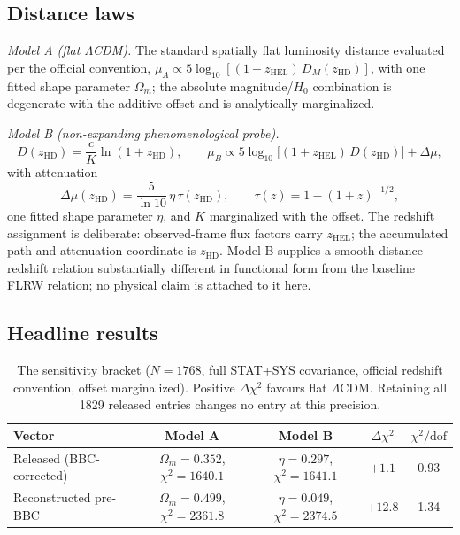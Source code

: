 \documentclass[11pt]{article}
\begin{document}
\subsection{Distance laws}
\label{sec:laws}

\emph{Model A (flat $\Lambda$CDM).} The standard spatially flat luminosity
distance evaluated per the official convention,
$\mu_A \propto 5\log_{10}[(1+z_{\mathrm{HEL}})\,D_M(z_{\mathrm{HD}})]$,
with one fitted shape parameter $\Omega_m$; the absolute magnitude/$H_0$
combination is degenerate with the additive offset and is analytically
marginalized.

\emph{Model B (non-expanding phenomenological probe).}
\begin{equation}
D(z_{\mathrm{HD}}) = \frac{c}{K}\ln(1+z_{\mathrm{HD}}), \qquad
\mu_B \propto 5\log_{10}\!\bigl[(1+z_{\mathrm{HEL}})\,
D(z_{\mathrm{HD}})\bigr] + \Delta\mu ,
\label{eq:modelB}
\end{equation}
with attenuation
\begin{equation}
\Delta\mu(z_{\mathrm{HD}})
= \frac{5}{\ln 10}\,\eta\,\tau(z_{\mathrm{HD}}), \qquad
\tau(z) = 1 - (1+z)^{-1/2},
\label{eq:atten}
\end{equation}
one fitted shape parameter $\eta$, and $K$ marginalized with the offset.
The redshift assignment is deliberate: observed-frame flux factors carry
$z_{\mathrm{HEL}}$; the accumulated path and attenuation coordinate is
$z_{\mathrm{HD}}$. Model B supplies a smooth distance--redshift relation substantially
different in functional form from the baseline FLRW relation; no physical
claim is attached to it here.

\subsection{Headline results}
\label{sec:headline}

\begin{table}[ht]
\centering
\caption{The sensitivity bracket ($N = 1768$, full STAT+SYS covariance,
official redshift convention, offset marginalized). Positive
$\Delta\chi^2$ favours flat $\Lambda$CDM. Retaining all 1829 released
entries changes no entry at this precision.}
\label{tab:headline}
\begin{tabular}{lccc c}
\toprule
Vector & Model A & Model B & $\Delta\chi^2$ & $\chi^2/\mathrm{dof}$ \\
\midrule
Released (BBC-corrected)
  & $\Omega_m = 0.352$, $\chi^2 = 1640.1$
  & $\eta = 0.297$, $\chi^2 = 1641.1$
  & $+1.1$ & 0.93 \\
Reconstructed pre-BBC
  & $\Omega_m = 0.499$, $\chi^2 = 2361.8$
  & $\eta = 0.049$, $\chi^2 = 2374.5$
  & $+12.8$ & 1.34 \\
\bottomrule
\end{tabular}
\end{table}
\end{document}
